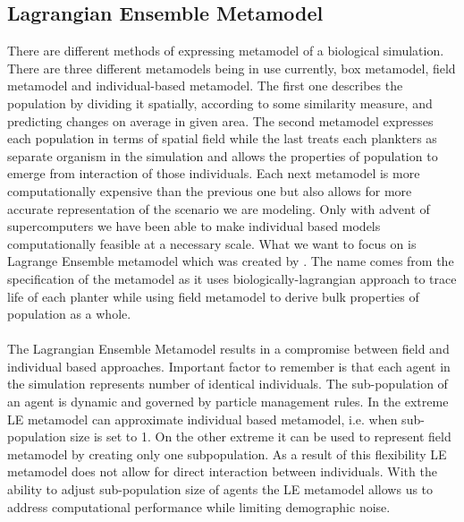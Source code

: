 \documentclass[12pt, a4paper]{report}
\begin{document}
\subsection{Lagrangian Ensemble Metamodel}\label{sec:lemeta}
There are different methods of expressing metamodel of a biological simulation. There are three different
metamodels being in use currently, box metamodel, field metamodel and individual-based metamodel. The first
one describes the population by dividing it spatially, according to some similarity measure,
and predicting changes on average in given area. The second metamodel expresses each population in terms
of spatial field while the last treats each plankters as separate organism in the simulation and allows
the properties of population to emerge from interaction of those individuals. Each next metamodel is more
computationally expensive than the previous one but also allows for more accurate representation of
the scenario we are modeling. Only with advent of supercomputers we have been able to make
individual based models computationally feasible at a necessary scale. What we want to focus on
is Lagrange Ensemble metamodel which was created by \cite{Woods2005}. The name comes from the
specification of the metamodel as it uses biologically-lagrangian approach to trace life of each planter
while using field metamodel to derive bulk properties of population as a whole.
\\\\
The Lagrangian Ensemble Metamodel results in a compromise between field and individual based approaches.
Important factor to remember is that each agent in the simulation represents number of identical individuals.
The sub-population of an agent is dynamic and governed by particle management rules. In the extreme
LE metamodel can approximate individual based metamodel, i.e. when sub-population size is set to 1.
On the other extreme it can be used to represent field metamodel by creating only one subpopulation. As a result
of this flexibility LE metamodel does not allow for direct interaction between individuals.
With the ability to adjust sub-population size of agents the LE metamodel allows us to address computational performance
while limiting demographic noise.
\end{document}
